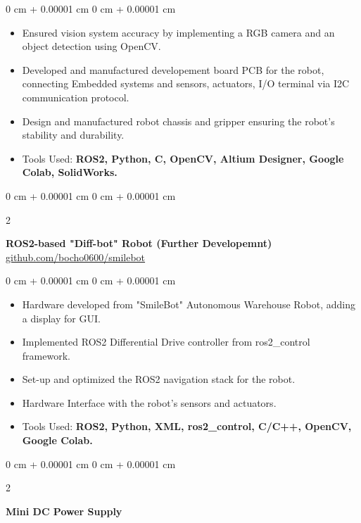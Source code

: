 \documentclass[10pt, letterpaper]{article}
\newenvironment{highlights}{
    \begin{itemize}[
        topsep=0.10 cm,
        parsep=0.10 cm,
        partopsep=0pt,
        itemsep=0pt,
        leftmargin=0 cm + 10pt
    ]
}{
    \end{itemize}
} %
\newenvironment{onecolentry}{
    \begin{adjustwidth}{
        0 cm + 0.00001 cm
    }{
        0 cm + 0.00001 cm
    }
}{
    \end{adjustwidth}
} %
\newenvironment{twocolentry}[2][]{
    \onecolentry
    \def\secondColumn{#2}
    \setcolumnwidth{\fill, 4.5 cm}
    \begin{paracol}{2}
}{
    \switchcolumn \raggedleft \secondColumn
    \end{paracol}
    \endonecolentry
} %
\begin{document}
\vspace{0.10 cm}
\begin{onecolentry}
      \begin{highlights}
            \item Ensured vision system accuracy by implementing a RGB camera and an object
            detection using OpenCV.
            \item Developed and manufactured developement board PCB for the robot, connecting
            Embedded systems and sensors, actuators, I/O terminal via I2C communication
            protocol.
            \item Design and manufactured robot chassis and gripper ensuring the robot's
            stability and durability.
            \item Tools Used:\textbf{ ROS2, Python, C, OpenCV, Altium Designer, Google Colab,
                  SolidWorks.}
      \end{highlights}
\end{onecolentry}

\vspace{0.4 cm}

\begin{twocolentry}{
            \href{https://github.com/bocho0600/smilebot}{github.com/bocho0600/smilebot}
      }
      \textbf{ROS2-based "Diff-bot" Robot (Further Developemnt)}\end{twocolentry}

\vspace{0.10 cm}
\begin{onecolentry}
      \begin{highlights}
            \item Hardware developed from "SmileBot" Autonomous Warehouse Robot, adding a display
            for GUI.
            \item Implemented ROS2 Differential Drive controller from ros2\_control framework.
            \item Set-up and optimized the ROS2 navigation stack for the robot.
            \item Hardware Interface with the robot's sensors and actuators.
            \item Tools Used: \textbf{ROS2, Python, XML, ros2\_control, C/C++, OpenCV, Google
                  Colab.}
      \end{highlights}
\end{onecolentry}

\vspace{0.4 cm}
\begin{twocolentry}{
      }
      \textbf{Mini DC Power Supply}\end{twocolentry}
\end{document}
